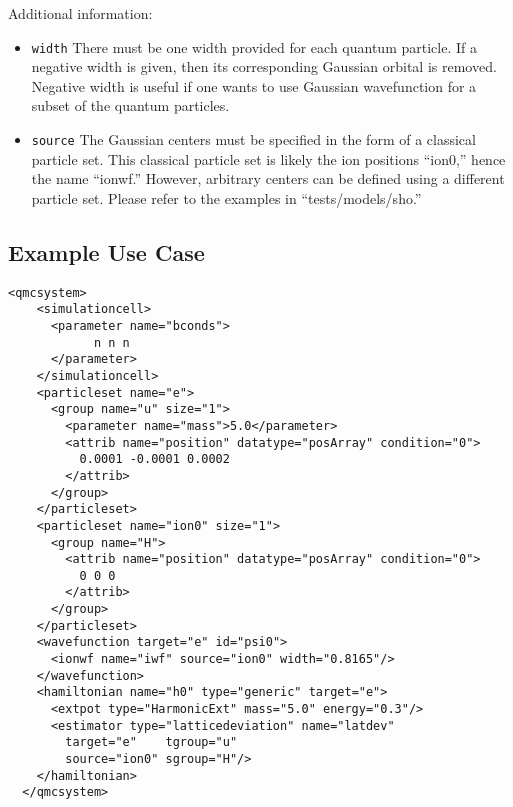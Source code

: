 \FloatBarrier

Additional information:
\begin{itemize}
\item \texttt{width} There must be one width provided for each quantum particle. If a negative width is given, then its corresponding Gaussian orbital is removed. Negative width is useful if one wants to use Gaussian wavefunction for a subset of the quantum particles.
\item \texttt{source} The Gaussian centers must be specified in the form of a classical particle set. This classical particle set is likely the ion positions ``ion0,'' hence the name ``ionwf.'' However, arbitrary centers can be defined using a different particle set. Please refer to the examples in ``tests/models/sho.''
\end{itemize}

\subsection{Example Use Case}
\begin{lstlisting}[style=QMCPXML]
  <qmcsystem>
    <simulationcell>
      <parameter name="bconds">
            n n n
      </parameter>
    </simulationcell>
    <particleset name="e">
      <group name="u" size="1">
        <parameter name="mass">5.0</parameter>
        <attrib name="position" datatype="posArray" condition="0">
          0.0001 -0.0001 0.0002
        </attrib>
      </group>
    </particleset>
    <particleset name="ion0" size="1">
      <group name="H">
        <attrib name="position" datatype="posArray" condition="0">
          0 0 0
        </attrib>
      </group>
    </particleset>
    <wavefunction target="e" id="psi0">
      <ionwf name="iwf" source="ion0" width="0.8165"/>
    </wavefunction>
    <hamiltonian name="h0" type="generic" target="e">
      <extpot type="HarmonicExt" mass="5.0" energy="0.3"/>
      <estimator type="latticedeviation" name="latdev" 
        target="e"    tgroup="u" 
        source="ion0" sgroup="H"/>
    </hamiltonian>
  </qmcsystem>
\end{lstlisting}

